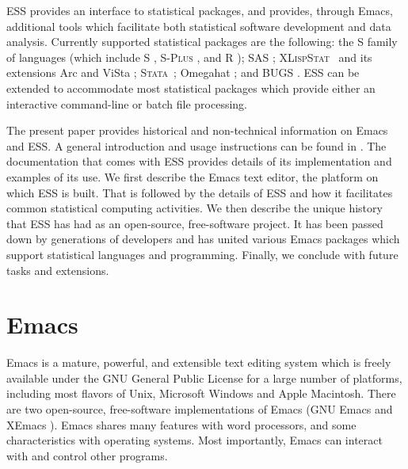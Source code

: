 \documentclass{article}
\newcommand*{\SAS}{\textsc{SAS}{\textregistered} }
\newcommand*{\Splus}{\textsc{S-Plus}}
\newcommand*{\XLispStat}{\textsc{XLispStat}}
\newcommand*{\Stata}{\textsc{Stata}}
\begin{document}
ESS provides an interface to statistical packages, and provides,
through Emacs, additional tools which facilitate both statistical
software development and data analysis.  Currently supported
statistical packages are the following:  the S family of languages (which include
S \citep{BecRCW88,ChaJH92,ChaJ98}, \Splus{} \citep{Splus}, and R
\citep{ihak:gent:1996}); \SAS \citep{SAS:8}; \XLispStat\ 
\citep{Tier90} and its extensions Arc \citep{Cook:Weisberg:1999} and
ViSta \citep{youn:fald:mcfa:1992}; \Stata\ \citep{Stata:6.0}; Omegahat
\citep{DTLang:2000}; and BUGS \citep{BUGS}.  ESS can be
extended to accommodate most statistical packages which provide either
an interactive command-line or batch file processing.

The present paper provides historical and non-technical information on
Emacs and ESS.  A general introduction and usage instructions can be
found in \cite{heiberger:dsc:2001}.  The documentation that comes with
ESS provides details of its implementation and examples of its use.
We first describe the Emacs text editor, the platform on which ESS is
built.  That is followed by the details of ESS and how it facilitates
common statistical computing activities.  We then describe the unique
history that ESS has had as an open-source, free-software project.  
It has been passed down by generations of developers and has 
united various Emacs packages which support
statistical languages and programming.  Finally, we conclude with
future tasks and extensions.

\section{Emacs}
\label{sec:emacs}

Emacs is a mature, powerful, and extensible text editing system which
is freely available under the GNU General Public License for a large
number of platforms, including most flavors of Unix, Microsoft Windows
and Apple Macintosh.  There are two open-source, free-software
implementations of Emacs (GNU Emacs \citep{GNU Emacs} and XEmacs
\citep{XEmacs}).  Emacs shares many features with
word processors, and some characteristics with operating systems.
Most importantly, Emacs can interact with and control other programs.
\end{document}
